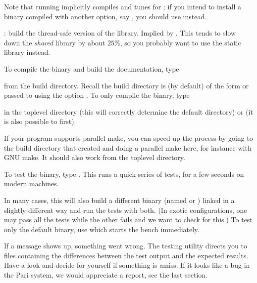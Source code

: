 Note that running  implicitly compiles and tunes for
; if you intend to install a binary compiled with
another option, say , you should use  instead.

: build the thread-safe version of the library. Implied by
. This tends to slow down the \emph{shared} library
 by about $25\%$, so you probably want to use the static
library  instead.

 To compile the  binary and build the
documentation, type


\noindent from the build directory. Recall the build directory is
(by default) of the form  or
passed to  using the option
. To only compile the  binary, type


\noindent in the toplevel directory (this will correctly determine
the  default directory) or  (it is also possible to  first).

If your  program supports parallel make, you can speed up the
process by going to the build directory that  created and
doing a parallel make here, for instance  with GNU make. It
should also work from the toplevel directory.


To test the binary, type . This runs a quick series of
tests, for a few seconds on modern machines.

In many cases, this will also build a different binary (named  or
) linked in a slightly different way and run the tests with both.
(In exotic configurations, one may pass all the tests while the other fails
and we want to check for this.) To test only the default binary, use
 which starts the bench immediately.

If a \kbd{[BUG]} message shows up, something went wrong. The testing utility
directs you to files containing the differences between the test output and
the expected results. Have a look and decide for yourself if something is
amiss. If it looks like a bug in the Pari system, we would appreciate a
report, see the last section.

